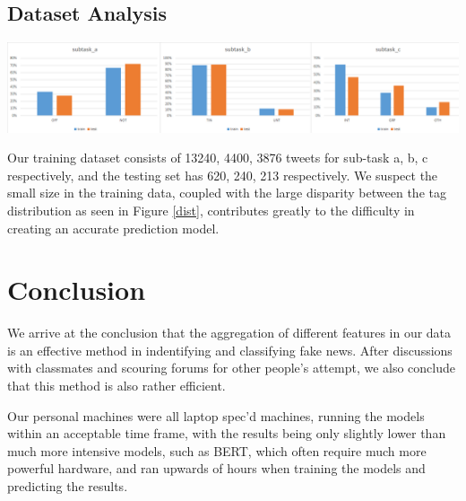 \documentclass[a4paper, 12pt]{article}
\begin{document}
        \subsection{Dataset Analysis}
        
        \begin{center}
            \includegraphics[width=\linewidth]{images/dist.png}
            \label{dist}
        \end{center}

        Our training dataset consists of 13240, 4400,  3876 tweets for sub-task a, b, c respectively, and the testing set has 620, 240, 213 respectively. We suspect the small size in the training data, coupled with the large disparity between the tag distribution as seen in Figure \ref{dist}, contributes greatly to the difficulty in creating an accurate prediction model.
        
    \begin{multicols}{2}

    \end{multicols}
    \newpage
    \section{Conclusion}
        We arrive at the conclusion that the aggregation of different features in our data is an effective method in indentifying and classifying fake news. After discussions with classmates and scouring forums for other people's attempt, we also conclude that this method is also rather efficient. 
        
        Our personal machines were all laptop spec'd machines, running the models within an acceptable time frame, with the results being only slightly lower than much more intensive models, such as BERT, which often require much more powerful hardware, and ran upwards of hours when training the models and predicting the results.

        \vskip 5cm
{}

\end{document}
